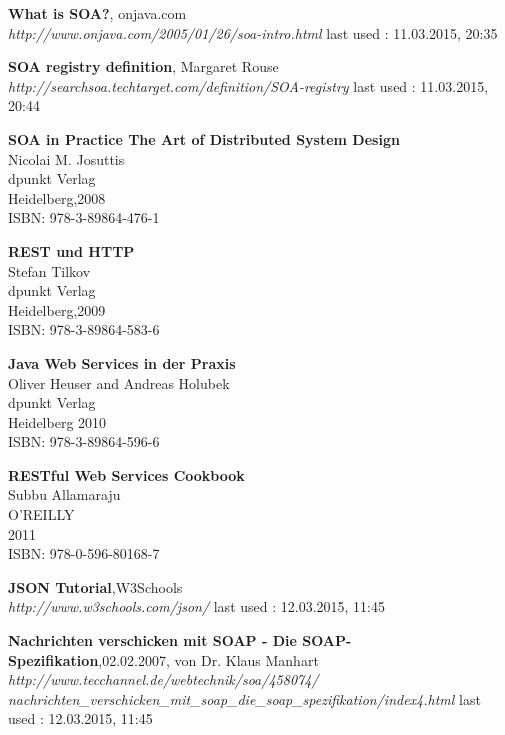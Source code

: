 \documentclass[12pt]{article}
\begin{document}
\begin{thebibliography}{56}
   	  
     	     	     	 
   \textbf{What is SOA?}, onjava.com \\
  \textit{http://www.onjava.com/2005/01/26/soa-intro.html}
  \newline last used : 11.03.2015, 20:35
 	 
 	 
   \textbf{SOA registry definition}, Margaret Rouse\\
  \textit{http://searchsoa.techtarget.com/definition/SOA-registry}
  \newline last used : 11.03.2015, 20:44 	 
   	     	   
   \textbf{SOA in Practice The Art of Distributed System Design}\\
   Nicolai M. Josuttis\\
   dpunkt Verlag \\
   Heidelberg,2008 \\
	ISBN: 978-3-89864-476-1

  \textbf{REST und HTTP}\\
   Stefan Tilkov\\
   dpunkt Verlag \\
   Heidelberg,2009 \\
	ISBN: 978-3-89864-583-6

  \textbf{Java Web Services in der Praxis}\\
  Oliver Heuser and Andreas Holubek\\
  dpunkt Verlag \\
  Heidelberg 2010 \\
	ISBN: 978-3-89864-596-6

  \textbf{RESTful Web Services Cookbook}\\
   Subbu Allamaraju\\
   O'REILLY \\
   2011 \\
	ISBN: 978-0-596-80168-7

  \textbf{JSON Tutorial},W3Schools\\
  \textit{http://www.w3schools.com/json/}
  \newline last used : 12.03.2015, 11:45
  
  \textbf{Nachrichten verschicken mit SOAP - Die SOAP-Spezifikation},02.02.2007, von Dr. Klaus Manhart\\
  \textit{http://www.tecchannel.de/webtechnik/soa/458074/\\nachrichten\_verschicken\_mit\_soap\_die\_soap\_spezifikation/index4.html
}
  \newline last used : 12.03.2015, 11:45


\end{thebibliography}
\end{document}
